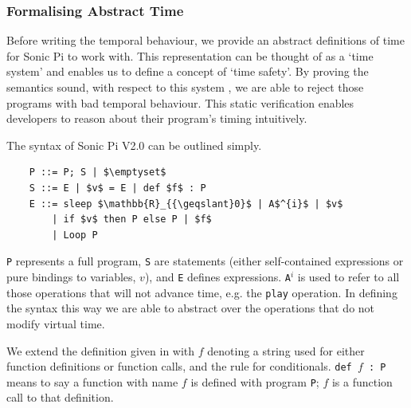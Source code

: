 \documentclass[11pt, abstracton, twoside, titlepage=true]{scrartcl}
\begin{document}
\subsubsection{Formalising Abstract Time} \label{abstractTime}
Before writing the temporal behaviour, we provide an abstract definitions of time 
for Sonic Pi to work with. This representation can be thought of as a `time system' 
and enables us to define a concept of `time safety'. By proving the semantics sound, 
with respect to this system \cite{AOB14}, we are able to reject those programs with 
bad temporal behaviour. This static verification enables developers to reason about 
their program's timing intuitively.

The syntax of Sonic Pi V2.0 can be outlined simply.
\\
\begin{lstlisting}
	P ::= P; S | $\emptyset$
	S ::= E | $v$ = E | def $f$ : P 
	E ::= sleep $\mathbb{R}_{{\geqslant}0}$ | A$^{i}$ | $v$ 
	    | if $v$ then P else P | $f$
	    | Loop P
\end{lstlisting}

\texttt{P} represents a full program, 
\texttt{S} are statements (either self-contained expressions or pure bindings 
to variables, $v$), and \texttt{E} defines expressions. \texttt{A$^{i}$} is used to 
refer to all those operations that will not advance time, e.g. the 
\texttt{play} operation. In defining the syntax this way we are able to abstract 
over the operations that do not modify virtual time.

We extend the definition given in \cite{AOB14} with $f$ denoting a string used for 
either function definitions or function calls, and the rule for conditionals. 
\texttt{def $f$ : P} means to say a function with name $f$ is defined with program 
\texttt{P}; $f$ is a function call to that definition.
\end{document}
